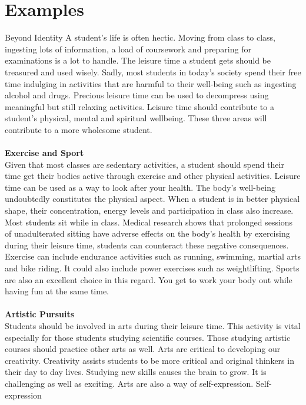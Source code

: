 \section{Examples}

\begin{mytcbox}{Beyond Identity}
A student’s life is often hectic. Moving from class to class, ingesting lots of information, a load
of coursework and preparing for examinations is a lot to handle. The leisure time a student gets
should be treasured and used wisely. Sadly, most students in today’s society spend their free
time indulging in activities that are harmful to their well-being such as ingesting alcohol and
drugs. Precious leisure time can be used to decompress using meaningful but still relaxing
activities. Leisure time should contribute to a student’s physical, mental and spiritual wellbeing. These three areas will contribute to a more wholesome student.
\\
\\
\textbf{Exercise and Sport}
\\
Given that most classes are sedentary activities, a student should spend their time get their
bodies active through exercise and other physical activities. Leisure time can be used as a way
to look after your health. The body’s well-being undoubtedly constitutes the physical aspect.
When a student is in better physical shape, their concentration, energy levels and participation
in class also increase. Most students sit while in class. Medical research shows that prolonged
sessions of unadulterated sitting have adverse effects on the body’s health by exercising during
their leisure time, students can counteract these negative consequences. Exercise can include
endurance activities such as running, swimming, martial arts and bike riding. It could also
include power exercises such as weightlifting. Sports are also an excellent choice in this regard.
You get to work your body out while having fun at the same time.
\\
\\
\textbf{Artistic Pursuits}
\\
Students should be involved in arts during their leisure time. This activity is vital especially for
those students studying scientific courses. Those studying artistic courses should practice other
arts as well. Arts are critical to developing our creativity. Creativity assists students to be more
critical and original thinkers in their day to day lives. Studying new skills causes the brain to
grow. It is challenging as well as exciting. Arts are also a way of self-expression. Self-expression

\end{mytcbox}
